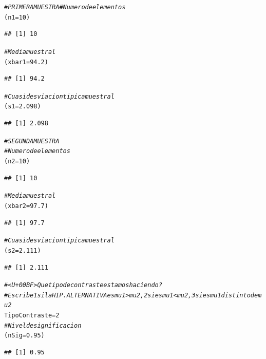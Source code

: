 \documentclass[10pt,a4paper]{article}\usepackage[]{graphicx}\usepackage[]{color}
\makeatletter
\newcommand{\hlnum}[1]{\textcolor[rgb]{0.686,0.059,0.569}{#1}}%
\newcommand{\hlcom}[1]{\textcolor[rgb]{0.678,0.584,0.686}{\textit{#1}}}%
\newcommand{\hlstd}[1]{\textcolor[rgb]{0.345,0.345,0.345}{#1}}%
\newcommand{\hlkwb}[1]{\textcolor[rgb]{0.69,0.353,0.396}{#1}}%
\newenvironment{kframe}{%
 \def\at@end@of@kframe{}%
 \ifinner\ifhmode%
  \def\at@end@of@kframe{\end{minipage}}%
  \begin{minipage}{\columnwidth}%
 \fi\fi%
 \def\FrameCommand##1{\hskip\@totalleftmargin \hskip-\fboxsep
 \colorbox{shadecolor}{##1}\hskip-\fboxsep
     \hskip-\linewidth \hskip-\@totalleftmargin \hskip\columnwidth}%
 \MakeFramed {\advance\hsize-\width
   \@totalleftmargin\z@ \linewidth\hsize
   \@setminipage}}%
 {\par\unskip\endMakeFramed%
 \at@end@of@kframe}
\newenvironment{knitrout}{}{} %
\newcounter {cont01}
\makeatother
\begin{document}
\begin{knitrout}
\color{fgcolor}\begin{kframe}
\begin{alltt}
 \hlcom{# PRIMERA MUESTRA # Numero de elementos}
 \hlstd{(n1} \hlkwb{=} \hlnum{10}\hlstd{)}
\end{alltt}
\begin{verbatim}
## [1] 10
\end{verbatim}
\begin{alltt}
 \hlcom{# Media muestral}
 \hlstd{(xbar1} \hlkwb{=} \hlnum{94.2}\hlstd{)}
\end{alltt}
\begin{verbatim}
## [1] 94.2
\end{verbatim}
\begin{alltt}
 \hlcom{# Cuasidesviacion tipica muestral}
 \hlstd{(s1} \hlkwb{=} \hlnum{2.098}\hlstd{)}
\end{alltt}
\begin{verbatim}
## [1] 2.098
\end{verbatim}
\begin{alltt}
 \hlcom{# SEGUNDA MUESTRA}
 \hlcom{# Numero de elementos}
 \hlstd{(n2} \hlkwb{=} \hlnum{10}\hlstd{)}
\end{alltt}
\begin{verbatim}
## [1] 10
\end{verbatim}
\begin{alltt}
 \hlcom{# Media muestral}
 \hlstd{(xbar2} \hlkwb{=} \hlnum{97.7}\hlstd{)}
\end{alltt}
\begin{verbatim}
## [1] 97.7
\end{verbatim}
\begin{alltt}
 \hlcom{# Cuasidesviacion tipica  muestral}
 \hlstd{(s2} \hlkwb{=} \hlnum{2.111}\hlstd{)}
\end{alltt}
\begin{verbatim}
## [1] 2.111
\end{verbatim}
\begin{alltt}
 \hlcom{# <U+00BF>Que tipo de contraste estamos haciendo?}
 \hlcom{# Escribe 1 si la HIP. ALTERNATIVA es mu1 > mu2, 2 si es mu1 < mu2, 3 si es mu1 distinto de mu2}
     \hlstd{TipoContraste} \hlkwb{=} \hlnum{2}
 \hlcom{#Nivel de significacion}
     \hlstd{(nSig} \hlkwb{=} \hlnum{0.95}\hlstd{)}
\end{alltt}
\begin{verbatim}
## [1] 0.95
\end{verbatim}
\end{kframe}
\end{knitrout}
\end{document}
